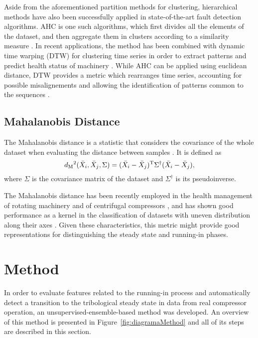 \documentclass[preprint,11pt,number]{elsarticle}
\begin{document}
Aside from the aforementioned partition methods for clustering, hierarchical methods have also been successfully applied in state-of-the-art fault detection algorithms. AHC is one such algorithms, which first divides all the elements of the dataset, and then aggregate them in clusters according to a similarity measure \cite{Murtagh2012}. In recent applications, the method has been combined with dynamic time warping (DTW) for clustering time series in order to extract patterns and predict health status of machinery \cite{Hennig2021,SepulvedaOviedo2022}. While AHC can be applied using euclidean distance, DTW provides a metric which rearranges time series, accounting for possible misalignements and allowing the identification of patterns common to the sequences \cite{Berndt1994}.

\subsection{Mahalanobis Distance}\label{subsec:MahalanobisDistance}

The Mahalanobis distance is a statistic that considers the covariance of the whole dataset when evaluating the distance between samples \cite{Jian2022}. It is defined as
\begin{equation}
    d\textsubscript{M}^2(\bar{X}_i,\bar{X}_j,\Sigma) = (\bar{X}_i-\bar{X}_j)\textsuperscript{T}\Sigma^\dagger(\bar{X}_i-\bar{X}_j),
\end{equation}
%
where $\Sigma$ is the covariance matrix of the dataset and $\Sigma^\dagger$ is its pseudoinverse.

The Mahalanobis distance has been recently employed in the health management of rotating machinery \cite{Chen2024, Zhang2024} and of centrifugal compressors \cite{Hou2023}, and has shown good performance as a kernel in the classification of datasets with uneven distribution along their axes \cite{Ruiz2001,Wang2007,Zeng2021}. Given these characteristics, this metric might provide good representations for distinguishing the steady state and running-in phases.

\section{Method}\label{sec:Method}

In order to evaluate features related to the running-in process and automatically detect a transition to the tribological steady state in data from real compressor operation, an unsupervised-ensemble-based method was developed. An overview of this method is presented in Figure~\ref{fig:diagramaMethod} and all of its steps are described in this section.
\end{document}
